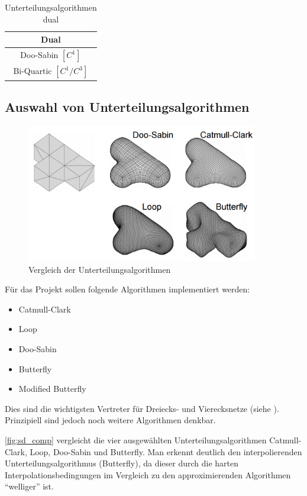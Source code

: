 \begin{table}
\center
\caption{Unterteilungsalgorithmen dual \cite[S. 79 ff.]{Zorin.subdivcourse}}
\label{tab:sd_comp_dual}
\begin{tabular}{c}
\\
\hline
\textbf{Dual}\\
\hline
Doo-Sabin \([C^1]\) \\
Bi-Quartic \([C^1/C^3]\) \\
\end{tabular}
\end{table}

\subsection{Auswahl von Unterteilungsalgorithmen}

\begin{figure}
  \centering
  \includegraphics[width=0.9\textwidth]{content/media/sd_overview.png}
  \caption{Vergleich der Unterteilungsalgorithmen \cite{Standford.24.07.2015}}
  \label{fig:sd_comp}
\end{figure}

Für das Projekt sollen folgende Algorithmen implementiert werden:
\begin{itemize}
	\item Catmull-Clark
	\item Loop
	\item Doo-Sabin
	\item Butterfly
	\item Modified Butterfly
\end{itemize}
Dies sind die wichtigsten Vertreter für Dreiecks- und Vierecksnetze
(siehe \cite[S. 65 ff.]{Zorin.subdivcourse} \cite{Zorin01aunified}).
Prinzipiell sind jedoch noch weitere Algorithmen denkbar.

\autoref{fig:sd_comp} vergleicht die vier ausgewählten
Unterteilungsalgorithmen Catmull-Clark, Loop, Doo-Sabin und Butterfly.
Man erkennt deutlich den interpolierenden Unterteilungsalgorithmus (Butterfly),
da dieser durch die harten Interpolationsbedingungen im
Vergleich zu den approximierenden Algorithmen \enquote{welliger} ist.
\cite{Zorin.subdivcourse}






